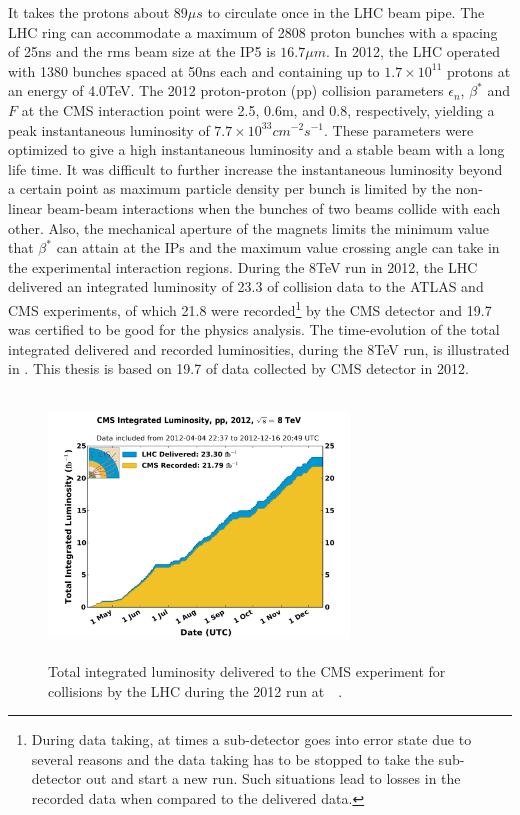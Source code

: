 It takes the protons about $89\mu{s}$ to circulate once in the LHC beam pipe. The LHC ring can accommodate  a maximum of 2808 proton bunches with 
a spacing of 25\unit{ns} and the rms beam size  at the IP5 is $16.7\mu{m}$.  In 2012, the LHC operated with 1380 bunches spaced at 50\unit{ns} each 
and containing up to $1.7\times10^{11}$ protons at an energy of 4.0\unit{TeV}. The 2012 proton-proton (pp) collision parameters $\epsilon_{n}$, 
$\beta^{\ast}$ and $F$ at the CMS interaction point were 2.5\unit{}, 0.6\unit{m}, and 0.8, respectively, yielding a peak instantaneous 
luminosity of $7.7\times10^{33}\unit{cm^{-2}s^{-1}}$. These parameters were optimized to give a high instantaneous luminosity and a stable beam 
with a long life time. It was difficult to further increase the instantaneous luminosity beyond a certain point as maximum particle density per 
bunch is limited by the non-linear beam-beam interactions when the bunches of two beams collide with each other. Also, the mechanical aperture of the 
magnets limits the minimum value that $\beta^{\ast}$ can attain at the IPs and the maximum value crossing angle can take in the experimental 
interaction regions. During the 8\unit{TeV} run in 2012, the LHC delivered an integrated luminosity of 23.3\unit{\fbinv} of \pp collision data to 
the ATLAS and CMS experiments, of which 21.8\unit{\fbinv} were recorded\footnote{During data taking, at times a sub-detector goes into error state 
due to several reasons and the data taking has to be stopped to take the sub-detector out and start a new run. Such situations lead to losses in the 
recorded data when compared to the delivered data.} by the CMS detector and 19.7\unit{\fbinv} was certified to be good for the physics analysis. The 
time-evolution of the total integrated delivered and recorded luminosities, during the 8\unit{TeV} run, is illustrated in \fig{\ref{fig:CMSLumi}}. 
This thesis is based on 19.7\unit{\fbinv} of \pp data collected by CMS detector in 2012.
\begin{figure}[h!]
\centering
 \includegraphics[width=8cm,height=7cm]{ch2/figures/Lumi_pp_2012.pdf}
 \caption{Total integrated luminosity delivered to the CMS experiment for \pp collisions by the LHC during the 2012 run at \sqrteighttev$\,$~\cite{Web:CMSLumi}.}
\label{fig:CMSLumi}
\end{figure}
